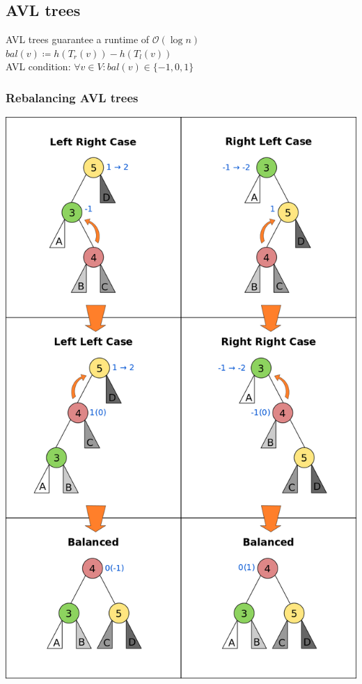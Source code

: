 \documentclass[9pt,landscape,a4paper, table]{extarticle}
\begin{document}
\begin{multicols*}{3}
\subsection{AVL trees}
AVL trees guarantee a runtime of $\mathcal{O}(\log n)$\\
$bal (v) \coloneqq h(T_r(v))-h(T_l(v))$\\
AVL condition: $\forall v \in V: bal(v) \in \{-1,0,1\}$

\subsubsection{Rebalancing AVL trees}
{
\hspace{1cm}\includegraphics[angle=90,width = 1\linewidth]{img/AVL_Tree_Rebalancing.png}
}


\end{multicols*}
\end{document}
